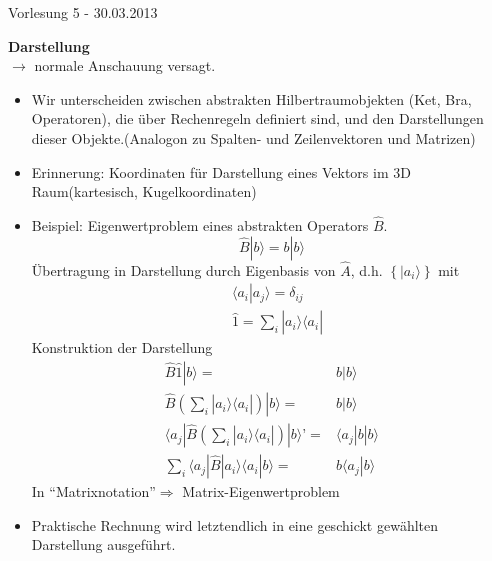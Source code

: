 \documentclass[10pt,article,colorback,accentcolor=tud9d]{scrartcl}
\begin{document}
\begin{flushright}
Vorlesung 5 - 30.03.2013
\end{flushright}
\textbf{Darstellung}\\
$\rightarrow$ normale Anschauung versagt.
\begin{itemize}
	\item Wir unterscheiden zwischen abstrakten Hilbertraumobjekten (Ket, Bra, Operatoren), die über Rechenregeln definiert sind, und den Darstellungen dieser Objekte.(Analogon zu Spalten- und Zeilenvektoren und Matrizen)
  \item Erinnerung: Koordinaten für Darstellung eines Vektors im 3D Raum(kartesisch, Kugelkoordinaten)
  \item Beispiel: Eigenwertproblem eines abstrakten Operators $\hat{B}$.
    \begin{equation}
    \hat{B}\left.\right|b\rangle =b\left.\right|b\rangle
    \end{equation}
    Übertragung in Darstellung durch Eigenbasis von $\hat{A}$, d.h. $\left\{\left.\right|a_i\rangle\right\}$ mit
    \begin{equation}
    \begin{aligned}
    &\langle a_i\left.\right|a_j\rangle=\delta_{ij}\\
    &\hat{1}=\sum_i\left.\right|a_i\rangle\langle a_i\left.\right|
    \end{aligned}
    \end{equation}
    Konstruktion der Darstellung
    \begin{equation}
    \begin{aligned}
      \hat{B}\hat{1}\left.\right|b\rangle=&b\left.\right|b\rangle\\
      \hat{B}\left(\sum_i\left.\right|a_i\rangle\langle a_i\left.\right|\right)\left.\right|b\rangle=&b\left.\right|b\rangle\\
      \langle a_j\left.\right|\hat{B}\left(\sum_i\left.\right|a_i\rangle\langle a_i\left.\right|\right)\left.\right|b\rangle’=&\langle a_j\left.\right|b\left.\right|b\rangle\\
      \sum_i\langle a_j\left.\right|\hat{B}\left.\right|a_i\rangle\langle a_i\left.\right|b\rangle =&b\langle a_j\left.\right|b\rangle      
    \end{aligned}
    \end{equation}
  In "`Matrixnotation"'$\Rightarrow$ Matrix-Eigenwertproblem %
\item Praktische Rechnung wird letztendlich in eine geschickt gewählten Darstellung ausgeführt.
\end{itemize}
\end{document}
